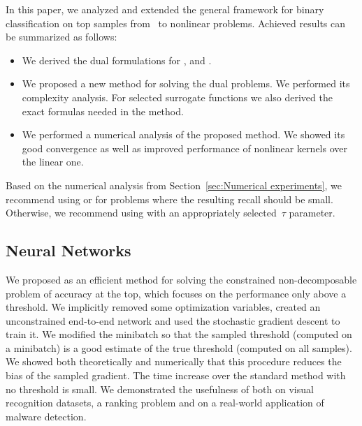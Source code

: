 In this paper, we analyzed and extended the general framework for binary classification on top samples from~\cite{adam2021general} to nonlinear problems. Achieved results can be summarized as follows:
\begin{itemize}
  \item We derived the dual formulations for \TopPush, \TopPushK and \PatMat.
  \item We proposed a new method for solving the dual problems. We performed its complexity analysis. For selected surrogate functions we also derived the exact formulas needed in the method.
  \item We performed a numerical analysis of the proposed method. We showed its good convergence as well as improved performance of nonlinear kernels over the linear one.
\end{itemize}
Based on the numerical analysis from Section~\ref{sec:Numerical experiments}, we recommend using \TopPush or \TopPushK for problems where the resulting recall should be small. Otherwise, we recommend using \PatMat with an appropriately selected~$\tau$ parameter.

\subsection{Neural Networks}

We proposed \DeepTopPush as an efficient method for solving the constrained non-decomposable problem of accuracy at the top, which focuses on the performance only above a threshold. We implicitly removed some optimization variables, created an unconstrained end-to-end network and used the stochastic gradient descent to train it. We modified the minibatch so that the sampled threshold (computed on a minibatch) is a good estimate of the true threshold (computed on all samples). We showed both theoretically and numerically that this procedure reduces the bias of the sampled gradient. The time increase over the standard method with no threshold is small. We demonstrated the usefulness of \DeepTopPush both on visual recognition datasets, a ranking problem and on a real-world application of malware detection.
